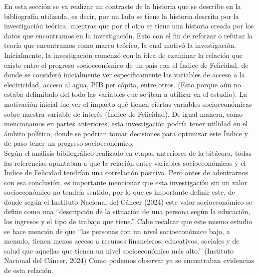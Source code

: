 En esta sección se va realizar un contraste de la historia que se describe en la bibliografía utilizada, es decir, por un lado se tiene la historia descrita por la investigación teórica, mientras que por el otro se tiene una historia creada por los datos que encontramos en la investigación. Esto con el fin de reforzar o refutar la teoría que encontramos como marco teórico, la cual motivó la investigación.\\

Inicialmente, la investigación comenzó con la idea de examinar la relación que existe entre el progreso socioeconómico de un país con el Índice de Felicidad, de donde se consideró inicialmente ver específicamente las variables de acceso a la electricidad, acceso al agua, PIB per cápita, entre otros. (Esto porque aún no estaba delimitado del todo las variables que se iban a utilizar en el estudio). La motivación inicial fue ver el impacto qué tienen ciertas variables socioeconómicas sobre nuestra variable de interés (Índice de Felicidad). De igual manera, como mencionamos en partes anteriores, esta investigación podría tener utilidad en el ámbito político, donde se podrían tomar decisiones para optimizar este Índice y de paso tener un progreso socioeconómico.\\

Según el análisis bibliográfico realizado en etapas anteriores de la bitácora, todas las referencias apuntaban a que la relación entre variables socioeconómicas y el Índice de Felicidad tendrían una correlación positiva. Pero antes de adentrarnos con esa conclusión, es importante mencionar que esta investigación sin un valor socioeconómico no tendría sentido, por lo que es importante definir este, de donde según el Instituto Nacional del Cáncer (2024) este valor socioeconómico se define como una ``descripción de la situación de una persona según la educación, los ingresos y el tipo de trabajo que tiene.'' Cabe recalcar que este mismo estudio  se hace mención de que ``las personas con un nivel socioeconómico bajo, a menudo, tienen menos acceso a recursos financieros, educativos, sociales y de salud que aquellas que tienen un nivel socioeconómico más alto.'' (Instituto Nacional del Cáncer, 2024) Como podemos observar ya se encontraban evidencias de esta relación. \\

